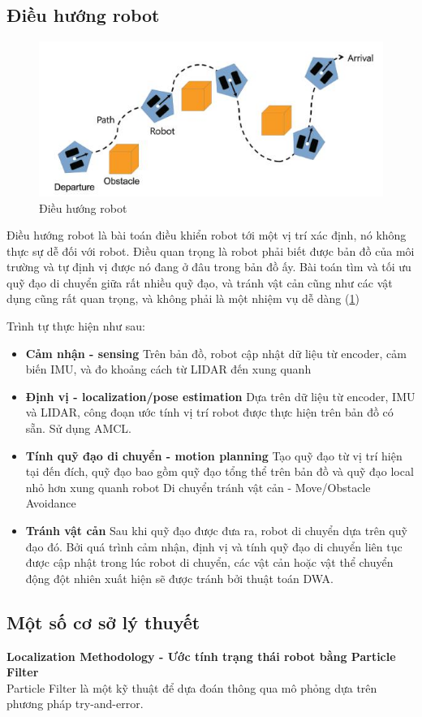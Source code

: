\subsection{Điều hướng robot}
\begin{figure}[tph]
	\centering
	\includegraphics[width=0.7\linewidth]{chapter2/figs/navigation}
	\caption{Điều hướng robot}
	\label{fig:navigation}
\end{figure}
Điều hướng robot là bài toán điều khiển robot tới một vị trí xác định, nó không thực sự dễ đối với robot. Điều quan trọng là robot phải biết được bản đồ của môi trường và tự định vị được nó đang ở đâu trong bản đồ ấy. Bài toán tìm và tối ưu quỹ đạo di chuyển giữa rất nhiều quỹ đạo, và tránh vật cản cũng như các vật dụng cũng rất quan trọng, và không phải là một nhiệm vụ dễ dàng (\figurename{\ref{fig:navigation}})

Trình tự thực hiện như sau:
\begin{itemize}
	\item \textbf{Cảm nhận - sensing}
	Trên bản đồ, robot cập nhật dữ liệu từ encoder, cảm biến IMU, và đo khoảng cách từ LIDAR đến xung quanh
	\item \textbf{Định vị - localization/pose estimation}
	Dựa trên dữ liệu từ encoder, IMU và LIDAR, công đoạn ước tính vị trí robot được thực hiện trên bản đồ có sẵn. Sử dụng AMCL.
	\item \textbf{Tính quỹ đạo di chuyển - motion planning}
	Tạo quỹ đạo từ vị trí hiện tại đến đích, quỹ đạo bao gồm quỹ đạo tổng thể trên bản đồ và quỹ đạo local nhỏ hơn xung quanh robot
	Di chuyển tránh vật cản - Move/Obstacle Avoidance
	\item \textbf{Tránh vật cản}
	Sau khi quỹ đạo được đưa ra, robot di chuyển dựa trên quỹ đạo đó. Bởi quá trình cảm nhận, định vị và tính quỹ đạo di chuyển liên tục được cập nhật trong lúc robot di chuyển, các vật cản hoặc vật thể chuyển động đột nhiên xuất hiện sẽ được tránh bởi thuật toán DWA.
		
\end{itemize}

\subsection{Một số cơ sở lý thuyết}
\textbf{Localization Methodology -  Ước tính trạng thái robot bằng Particle Filter }\\
Particle Filter là  một kỹ thuật để dựa đoán thông  qua mô phỏng dựa trên phương pháp try-and-error.  

